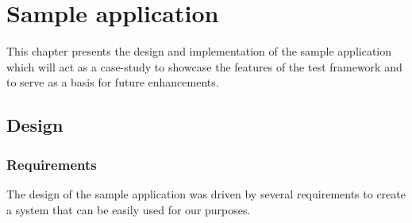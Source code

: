\chapter{Sample application}

This chapter presents the design and implementation of the sample application which will act as a case-study to showcase the features of the test framework and to serve as a basis for future enhancements. 


\section{Design}

\subsection{Requirements} \label{sample-app-requirements}


The design of the sample application was driven by several requirements to create a system that can be easily used for our purposes.

